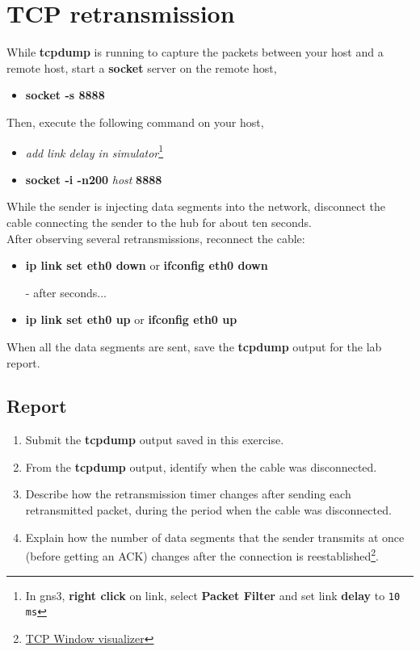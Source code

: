 \documentclass[10pt,a4paper]{article}
\numberwithin{equation}{section}
\numberwithin{figure}{section}
\numberwithin{table}{section}
\begin{document}
\section{TCP retransmission}
    While \textbf{tcpdump} is running to capture the packets between your host and a remote host, start a \textbf{socket} server on the remote host,
    \begin{itemize}
    	\item \textbf{socket -s 8888}
    \end{itemize}
    Then, execute the following command on your host,
    \begin{itemize}
        \item \textit{add link delay in simulator}\footnote{In gns3, \textbf{right click} on link, select \textbf{Packet Filter} and set link \textbf{delay} to \texttt{10 ms}}
        \item \textbf{socket -i -n200} \textit{host} \textbf{8888}
    \end{itemize}
    While the sender is injecting data segments into the network, disconnect the cable connecting the sender to the hub for about ten seconds. \\
    After observing several retransmissions, reconnect the cable:
    \begin{itemize}
    	\setlength{\itemindent}{30pt}
        \item \textbf{ip link set eth0 down} or \textbf{ifconfig eth0 down}
        \item [-] after seconds...
        \item \textbf{ip link set eth0 up} or \textbf{ifconfig eth0 up}
    \end{itemize}
    When all the data segments are sent, save the \textbf{tcpdump} output for the lab report.
    \subsection*{Report}
    \begin{enumerate}
        \item Submit the \textbf{tcpdump} output saved in this exercise.
        \item From the \textbf{tcpdump} output, identify when the cable was disconnected.
        \item Describe how the retransmission timer changes after sending each retransmitted packet, during the period when the cable was disconnected.
        \item Explain how the number of data segments that the sender transmits at once (before getting an ACK) changes after the connection is reestablished\footnote{\href{http://www.ccs-labs.org/teaching/rn/animations/gbn_sr/}{TCP Window visualizer}}.
    \end{enumerate}
    
\end{document}
